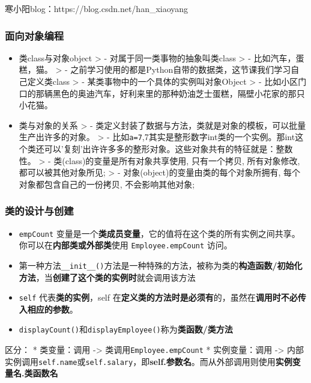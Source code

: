 \documentclass[11pt]{article}
\providecommand{\tightlist}{%
      \setlength{\itemsep}{0pt}\setlength{\parskip}{0pt}}
\begin{document}
寒小阳blog：https://blog.csdn.net/han\_xiaoyang

\subsubsection{面向对象编程}\label{ux9762ux5411ux5bf9ux8c61ux7f16ux7a0b}

\begin{itemize}
\item
  类class与对象object \textgreater{} - 对属于同一类事物的抽象叫类class
  \textgreater{} - 比如汽车，蛋糕，猫。 \textgreater{} -
  之前学习使用的都是Python自带的数据类，这节课我们学习自己定义类class
  \textgreater{} - 某类事物中的一个具体的实例叫对象Object \textgreater{}
  -
  比如小区门口的那辆黑色的奥迪汽车，好利来里的那种奶油芝士蛋糕，隔壁小花家的那只小花猫。
\item
  类与对象的关系 \textgreater{} -
  类定义封装了数据与方法，类就是对象的模板，可以批量生产出许多的对象。
  \textgreater{} -
  比如\texttt{a=7},7其实是整形数字int类的一个实例。那int这个类还可以'复刻'出许许多多的整形对象。这些对象共有的特征就是：整数性。
  \textgreater{} - 类(class)的变量是所有对象共享使用, 只有一个拷贝,
  所有对象修改, 都可以被其他对象所见; \textgreater{} -
  对象(object)的变量由类的每个对象所拥有, 每个对象都包含自己的一份拷贝,
  不会影响其他对象;
\end{itemize}

    \subsubsection{类的设计与创建}\label{ux7c7bux7684ux8bbeux8ba1ux4e0eux521bux5efa}

\begin{itemize}
\tightlist
\item
  \texttt{empCount}
  变量是一个\textbf{类成员变量}，它的值将在这个类的所有实例之间共享。你可以在\textbf{内部类或外部类}使用
  \texttt{Employee.empCount} 访问。
\item
  第一种方法\texttt{\_\_init\_\_()}方法是一种特殊的方法，被称为类的\textbf{构造函数/初始化方法}，当\textbf{创建了这个类的实例时}就会调用该方法
\item
  \texttt{self} 代表\textbf{类的实例}，self
  在\textbf{定义类的方法时是必须有}的，虽然在\textbf{调用时不必传入相应的参数}。
\item
  \texttt{displayCount()}和\texttt{displayEmployee()}称为\textbf{类函数/类方法}
\end{itemize}

区分： * 类变量：调用 -\textgreater{} 类调用\texttt{Employee.empCount} *
实例变量：调用 -\textgreater{}
内部实例调用\texttt{self.name}或\texttt{self.salary}，即\textbf{self.参数名}。而从外部调用则使用\textbf{实例变量名.类函数名}
\end{document}
